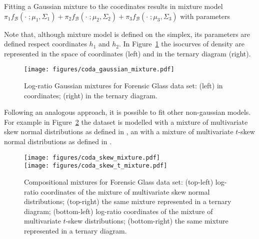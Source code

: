 \documentclass[12pt, a4paper]{article}
\begin{document}
Fitting a Gaussian mixture to the coordinates results in mixture model
$
\pi_1 f_{\mathcal{B}}(\cdot\;; \mu_1, \Sigma_1) + \pi_2 f_{\mathcal{B}}(\cdot\;; \mu_2, \Sigma_2) + \pi_3 f_{\mathcal{B}}(\cdot\;; \mu_3, \Sigma_3)
$
with parameters

{\small  }

Note that, although mixture model is defined on the simplex, its parameters are defined respect coordinates $h_1$ and $h_2$. In Figure~\ref{fig07fittingcodaGaussian} the isocurves of density are represented in the space
of coordinates (left) and in the ternary diagram (right).

\begin{figure}[htbp]
\centering
\texttt{[image: figures/coda\_gaussian\_mixture.pdf]}\\
\caption{Log-ratio Gaussian mixtures for Forensic Glass data set: (left) in coordinates; (right) in the ternary diagram.}
\label{fig07fittingcodaGaussian}
\end{figure}



Following an analogous approach, it is possible to fit other non-gaussian models. For example in Figure~\ref{othercodadist} the dataset is modelled with a mixture of multivariate skew normal distributions as defined in \citep{prates2013mixsmsn}, an with a mixture of multivariate $t$-skew normal distributions as defined in \citep{mclachlan2013emmixuskew}.


\begin{figure}[htbp]
\centering
\texttt{[image: figures/coda\_skew\_mixture.pdf]}\\%
\texttt{[image: figures/coda\_skew\_t\_mixture.pdf]}%
\caption{Compositional mixtures for Forensic Glass data set: (top-left) log-ratio coordinates of the mixture of multivariate skew normal distributions; (top-right) the same mixture represented in a ternary diagram; (bottom-left) log-ratio coordinates of the mixture of multivariate $t$-skew distributions; (bottom-right) the same mixture represented in a ternary diagram.}
\label{othercodadist}
\end{figure}
\end{document}
